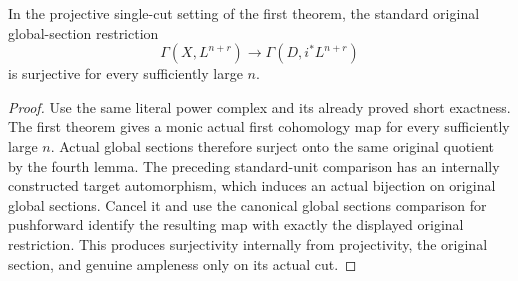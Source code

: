 \begin{theorem}
\label{thm:seshadri-actual-single-cut-eventual-restriction-onto}
\leanok
In the projective single-cut setting of the first theorem, the standard
original global-section restriction
\[
\Gamma(X,L^{n+r})\longrightarrow\Gamma(D,i^*L^{n+r})
\]
is surjective for every sufficiently large $n$.
\end{theorem}
\begin{proof}
Use the same literal power complex and its already proved short exactness.
The first theorem gives a monic actual first cohomology map for every
sufficiently large $n$. Actual global sections therefore surject onto the
same original quotient by the fourth lemma. The preceding standard-unit
comparison has an internally constructed target automorphism, which induces
an actual bijection on original global sections. Cancel it and use the
canonical global sections comparison for pushforward
identify the resulting map with exactly the displayed original restriction.
This produces surjectivity internally from projectivity, the original
section, and genuine ampleness only on its actual cut.
\end{proof}
